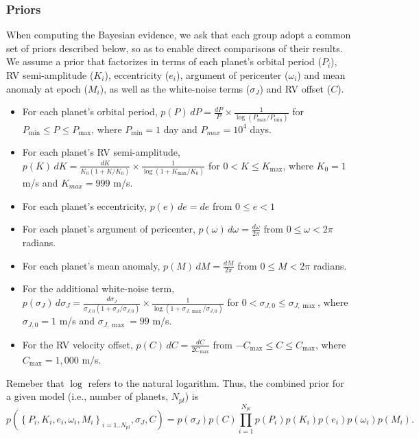 \documentclass{article}
\begin{document}
\subsubsection{Priors}

When computing the Bayesian evidence, we ask that each group adopt a common set of priors described below, so as to enable direct comparisons of their results.  
We assume a prior that factorizes in terms of each planet's orbital period ($P_i$), RV semi-amplitude ($K_i$), eccentricity ($e_i$), argument of pericenter ($\omega_i$) and mean anomaly at epoch ($M_i$), as well as the white-noise terms ($\sigma_J$) and RV offset ($C$).
%
\begin{itemize}
\item For each planet's orbital period, $p(P) \, dP = \frac{dP}{P} \times  \frac{1}{\log(P_{\max}/P_{\min})}$ for $P_{\min} \le P \le P_{\max}$, where $P_{\min}=1$ day and $P_{max}=10^4$ days.
\item For each planet's RV semi-amplitude, $p(K) \, dK = \frac{dK}{K_0(1+K/K_0)} \times  \frac{1}{\log(1+K_{\max}/K_0)}$ for $0<K\le K_{\max}$, where $K_0=1$ m/s and $K_{max}=999$ m/s.
\item For each planet's eccentricity, $p(e) \, de = de$ from $0 \leq e < 1$
\item For each planet's argument of pericenter, $p(\omega) \, d\omega = \frac{d\omega}{2\pi}$ from $0 \leq \omega < 2\pi$ radians.
\item For each planet's mean anomaly, $p(M) \, dM = \frac{dM}{2\pi}$ from $0 \leq M < 2\pi$ radians.
\item For the additional white-noise term, $p(\sigma_J) \, d\sigma_J = \frac{d\sigma_J}{\sigma_{J,0}(1+\sigma_J/\sigma_{J,0})} \times  \frac{1}{\log(1+\sigma_{J,\max}/\sigma_{J,0})}$ for $0<\sigma_{J,0} \le \sigma_{J,\max}$, where $\sigma_{J,0}=1$ m/s and $\sigma_{J,\max}=99$ m/s.
\item For the RV velocity offset, $p(C) \, dC = \frac{dC}{2C_{\max}}$ from $-C_{\max} \le C \le C_{\max}$, where $C_{\max} = 1,000$ m/s.
\end{itemize}
%
Remeber that $\log$ refers to the natural logarithm.
Thus, the combined prior for a given model (i.e., number of planets, $N_{pl}$) is
%
\begin{equation}
p\left(\left\{P_i,K_i,e_i,\omega_i,M_i\right\}_{i=1..N_{pl}}, \sigma_J, C \right) =
p(\sigma_J) p(C) \prod_{i=1}^{N_{pl}} p(P_i) p(K_i) p(e_i) p(\omega_i) p(M_i).
\end{equation}
%
\end{document}
